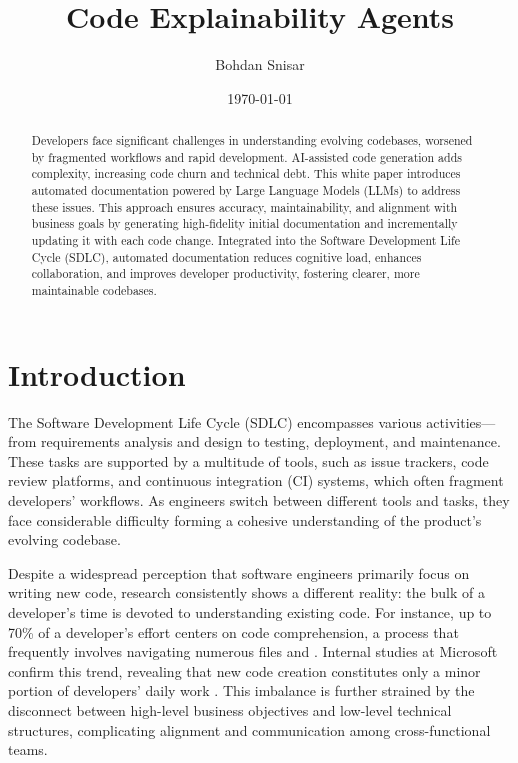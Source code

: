 \documentclass[12pt,oneside]{article}
\date{\small\today}
\title{%
  Code Explainability Agents \\
  \colorbox{mypink}{\small\sffamily\color{white}{White Paper}}}
\author{Bohdan Snisar}
\begin{document}
\raggedbottom
\maketitle

\begin{abstract}
Developers face significant challenges in understanding evolving codebases, worsened by fragmented workflows and rapid development. AI-assisted code generation adds complexity, increasing code churn and technical debt. This white paper introduces automated documentation powered by Large Language Models (LLMs) to address these issues. This approach ensures accuracy, maintainability, and alignment with business goals by generating high-fidelity initial documentation and incrementally updating it with each code change. Integrated into the Software Development Life Cycle (SDLC), automated documentation reduces cognitive load, enhances collaboration, and improves developer productivity, fostering clearer, more maintainable codebases.
\end{abstract}

\section{Introduction}

The Software Development Life Cycle (SDLC) encompasses various activities— from requirements analysis and design to 
testing, deployment, and maintenance. These tasks are supported by a multitude of tools, such as issue trackers, code 
review platforms, and continuous integration (CI) systems, which often fragment developers’ workflows. As engineers 
switch between different tools and tasks, they face considerable difficulty forming a cohesive understanding of the 
product’s evolving codebase.

Despite a widespread perception that software engineers primarily focus on writing new code, research consistently 
shows a different reality: the bulk of a developer’s time is devoted to understanding existing code. For instance, 
up to 70\% of a developer’s effort centers on code comprehension, a process that frequently involves navigating 
numerous files \textcite{ko2006exploratory} and \textcite{Schroer_2024}. Internal studies at Microsoft confirm this 
trend, revealing that new code creation constitutes only a minor portion of developers’ daily work 
\textcite{meyer2021today}. This imbalance is further strained by the disconnect between high-level business objectives 
and low-level technical structures, complicating alignment and communication among cross-functional teams.
\end{document}
